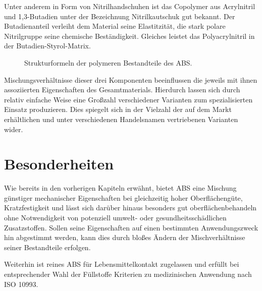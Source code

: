             Unter anderem in Form von Nitrilhandschuhen ist das Copolymer aus Acrylnitril und
            1,3-Butadien unter der Bezeichnung Nitrilkautschuk gut bekannt. Der Butadienanteil verleiht dem Material seine Elastitzität,
            die stark polare Nitrilgruppe seine chemische Beständigkeit. Gleiches leistet das Polyacrylnitril in der Butadien-Styrol-Matrix.
            \begin{figure}[H]%
                \centering
                \qquad
                \qquad
                \caption[Strukturformeln der polymeren Bestandteile des ABS]{Strukturformeln der polymeren Bestandteile des ABS.}%
                \label{fig:strukturformeln polymere}%
            \end{figure}
            
            Mischungsverhältnisse dieser drei Komponenten beeinflussen die jeweils mit ihnen assoziierten Eigenschaften des
            Gesamtmaterials. Hierdurch lassen sich durch relativ einfache Weise eine Großzahl verschiedener Varianten zum
            spezialisierten Einsatz produzieren. Dies spiegelt sich in der Vielzahl der auf dem Markt erhältlichen und unter
            verschiedenen Handelsnamen vertriebenen Varianten wider.

    \section{Besonderheiten}
            Wie bereits in den vorherigen Kapiteln erwähnt, bietet ABS eine Mischung günstiger mechanischer Eigenschaften
            bei gleichzeitig hoher Oberflächengüte, Kratzfestigkeit und lässt sich darüber hinaus besonders gut oberflächenbehandeln
            ohne  Notwendigkeit von potenziell umwelt- oder gesundheitsschädlichen Zusatzstoffen. Sollen seine
            Eigenschaften auf einen bestimmten Anwendungszweck hin abgestimmt werden, kann dies durch bloßes Ändern der
            Mischverhältnisse seiner Bestandteile erfolgen.

            Weiterhin ist reines ABS für Lebensmittelkontakt zugelassen und erfüllt bei entsprechender Wahl der Füllstoffe
            Kriterien zu medizinischen Anwendung nach ISO 10993\cite{ABS.M30i.Datasheet.Stratasys.20210210}.
